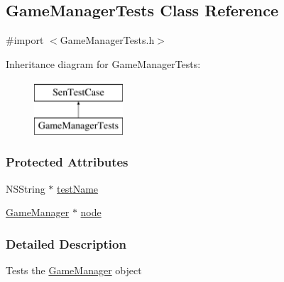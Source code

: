 \hypertarget{interface_game_manager_tests}{\subsection{Game\-Manager\-Tests Class Reference}
\label{d2/d7d/interface_game_manager_tests}
}


{\ttfamily \#import $<$Game\-Manager\-Tests.\-h$>$}

Inheritance diagram for Game\-Manager\-Tests\-:\begin{figure}[H]
\begin{center}
\leavevmode
\includegraphics[height=2.000000cm]{d2/d7d/interface_game_manager_tests}
\end{center}
\end{figure}
\subsubsection*{Protected Attributes}
\begin{DoxyCompactItemize}
\item 
N\-S\-String $\ast$ \hyperlink{interface_game_manager_tests_a094b37dc4161bb858dde0d046fbce83d}{test\-Name}
\item 
\hyperlink{interface_game_manager}{Game\-Manager} $\ast$ \hyperlink{interface_game_manager_tests_af0831d60fcbb503cc3660bc53c5ebb32}{node}
\end{DoxyCompactItemize}


\subsubsection{Detailed Description}
Tests the \hyperlink{interface_game_manager}{Game\-Manager} object 


